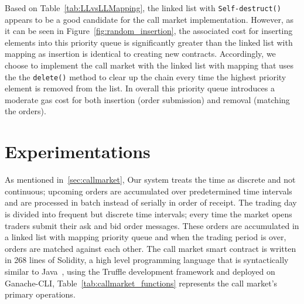 Based on Table~\ref{tab:LLvsLLMapping}, the linked list with \texttt{Self-destruct()} appears to be a good candidate for the call market implementation. However, as it can be seen in Figure~\ref{fig:random_insertion}, the associated cost for inserting elements into this priority queue is significantly greater than the linked list with mapping as insertion is identical to creating new contracts. Accordingly, we choose to implement the call market with the linked list with mapping that uses the  the \texttt{delete()} method to clear up the chain every time the highest priority element is removed from the list. In overall this priority queue introduces a moderate gas cost for both insertion (\ie order submission) and removal (\ie matching the orders). 




\section{Experimentations}
 
As mentioned in~\ref{sec:callmarket}, Our system treats the time as discrete and not continuous; upcoming orders are accumulated over predetermined time intervals and are processed in batch instead of serially in order of receipt. The trading day is divided into frequent but discrete time intervals; every time the market opens traders submit their ask and bid order messages.  These orders are accumulated in a linked list with mapping priority queue and when the trading period is over, orders are matched against each other. The call market smart contract is written in 268 lines of Solidity, a high level programming language that is syntactically similar to Java~\cite{Ethereum41:online}, using the Truffle development framework and deployed on Ganache-CLI, Table~\ref{tab:callmarket_functions} represents the call market's primary operations.


